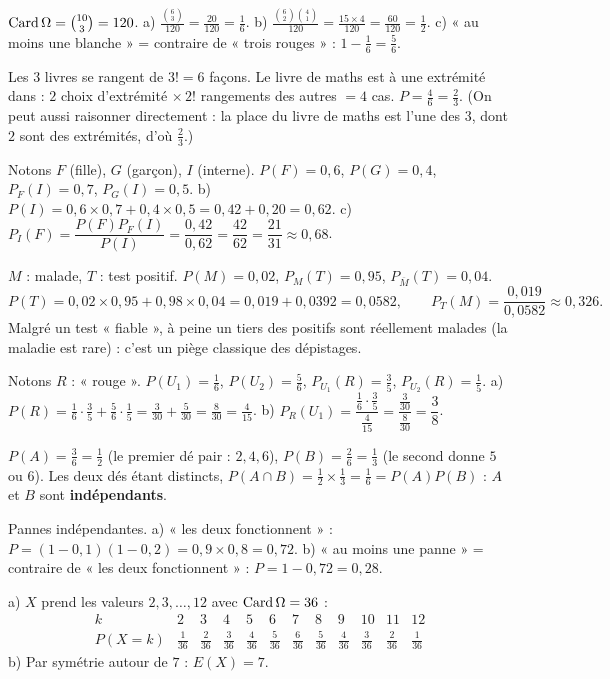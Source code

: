 $\operatorname{Card}\Omega=\binom{10}{3}=120$.\;
a) $\frac{\binom63}{120}=\frac{20}{120}=\frac16$.\;
b) $\frac{\binom62\binom41}{120}=\frac{15\times4}{120}=\frac{60}{120}=\frac12$.\;
c) « au moins une blanche » = contraire de « trois rouges » : $1-\frac16=\frac56$.

Les $3$ livres se rangent de $3!=6$ façons. Le livre de maths est à une extrémité
dans : $2$ choix d'extrémité $\times\,2!$ rangements des autres $=4$ cas.
$P=\frac46=\frac23$. (On peut aussi raisonner directement : la place du livre de
maths est l'une des $3$, dont $2$ sont des extrémités, d'où $\frac23$.)

Notons $F$ (fille), $G$ (garçon), $I$ (interne). $P(F)=0{,}6$, $P(G)=0{,}4$,
$P_F(I)=0{,}7$, $P_G(I)=0{,}5$.\;
b) $P(I)=0{,}6\times0{,}7+0{,}4\times0{,}5=0{,}42+0{,}20=0{,}62$.\;
c) $P_I(F)=\dfrac{P(F)P_F(I)}{P(I)}=\dfrac{0{,}42}{0{,}62}=\dfrac{42}{62}=\dfrac{21}{31}\approx0{,}68$.

$M$ : malade, $T$ : test positif. $P(M)=0{,}02$, $P_M(T)=0{,}95$,
$P_{\overline M}(T)=0{,}04$.
\[
P(T)=0{,}02\times0{,}95+0{,}98\times0{,}04=0{,}019+0{,}0392=0{,}0582,\qquad
P_T(M)=\frac{0{,}019}{0{,}0582}\approx0{,}326.
\]
Malgré un test « fiable », à peine un tiers des positifs sont réellement malades
(la maladie est rare) : c'est un piège classique des dépistages.

Notons $R$ : « rouge ». $P(U_1)=\frac16$, $P(U_2)=\frac56$,
$P_{U_1}(R)=\frac35$, $P_{U_2}(R)=\frac15$.\;
a) $P(R)=\frac16\cdot\frac35+\frac56\cdot\frac15=\frac{3}{30}+\frac{5}{30}=\frac{8}{30}=\frac{4}{15}$.\;
b) $P_R(U_1)=\dfrac{\frac16\cdot\frac35}{\frac{4}{15}}=\dfrac{\frac{3}{30}}{\frac{8}{30}}=\dfrac{3}{8}$.

$P(A)=\frac{3}{6}=\frac12$ (le premier dé pair : $2,4,6$), $P(B)=\frac26=\frac13$
(le second donne $5$ ou $6$). Les deux dés étant distincts,
$P(A\cap B)=\frac12\times\frac13=\frac16=P(A)P(B)$ : $A$ et $B$ sont
\textbf{indépendants}.

Pannes indépendantes. a) « les deux fonctionnent » :
$P=(1-0{,}1)(1-0{,}2)=0{,}9\times0{,}8=0{,}72$.\;
b) « au moins une panne » = contraire de « les deux fonctionnent » :
$P=1-0{,}72=0{,}28$.

a) $X$ prend les valeurs $2,3,\dots,12$ avec $\operatorname{Card}\Omega=36$ :
\[
\begin{array}{c|ccccccccccc}
k & 2&3&4&5&6&7&8&9&10&11&12\\\hline
P(X{=}k)&\frac1{36}&\frac2{36}&\frac3{36}&\frac4{36}&\frac5{36}&\frac6{36}&\frac5{36}&\frac4{36}&\frac3{36}&\frac2{36}&\frac1{36}
\end{array}
\]
b) Par symétrie autour de $7$ : $E(X)=7$.

